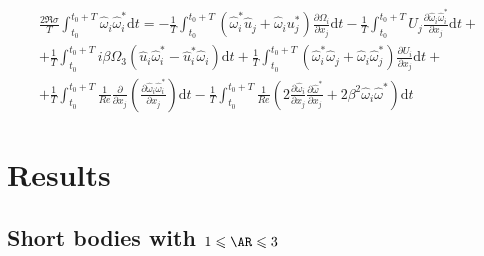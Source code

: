 \documentclass{jfm}
\begin{document}
\begin{equation}
  \begin{gathered}
  \frac{2 \Re{\sigma}}{T} \int_{t_0}^{t_0+T} \hat{\omega}_i \hat{\omega}_i^* \text{d}t = 
  - \frac{1}{T} \int_{t_0}^{t_0+T} \left( \hat{\omega}_i^* \hat{u}_j + \hat{\omega}_i u_j^* \right) \frac{\partial \Omega_i}{\partial x_j} \text{d}t
  - \frac{1}{T} \int_{t_0}^{t_0+T} U_j \frac{\partial \hat{\omega}_i \hat{\omega}_i^* }{\partial x_j} \text{d} t + \\
  + \frac{1}{T} \int_{t_0}^{t_0+T}    i \beta \Omega_3 \left( \hat{u}_i \hat{\omega}_{i}^* - \hat{u}_i^* \hat{\omega}_i \right)  \text{d} t
  + \frac{1}{T} \int_{t_0}^{t_0+T} \left( \hat{\omega}_i^* \hat{\omega}_j + \hat{\omega}_i \hat{\omega}_j^* \right) \frac{\partial U_i}{\partial x_j} \text{d} t + \\
  + \frac{1}{T} \int_{t_0}^{t_0+T}    \frac{1}{Re} \frac{\partial}{\partial x_j} \left( \frac{\partial \hat{\omega}_i \hat{\omega}_i^*}{\partial x_j} \right) \text{d} t -
  \frac{1}{T} \int_{t_0}^{t_0+T} \frac{1}{Re} \left( 2 \frac{\partial \hat{\omega}_i}{\partial x_j} \frac{\partial \hat{\omega}^*}{\partial x_j} + 2 \beta^2 \hat{\omega}_i \hat{\omega}^* \right) \text{d} t
  \end{gathered}
\end{equation}


\section{Results}

\subsection{Short bodies with $1 \le \AR \le 3$}
\end{document}
